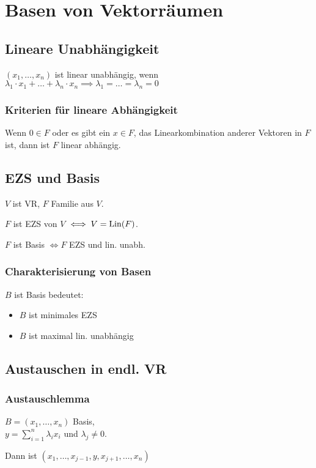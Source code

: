 \section*{Basen von Vektorräumen}

\subsection*{Lineare Unabhängigkeit}
$(x_1, \dots, x_n)$ ist linear unabhängig, wenn \\
$\lambda_1\cdot x_1 + \dots + \lambda_n \cdot x_n \implies \lambda_1 = \dots = \lambda_n = 0$

\subsubsection*{Kriterien für lineare Abhängigkeit}
Wenn $0\in F$ oder es gibt ein $x\in F$, das Linearkombination anderer Vektoren in $F$ ist, dann ist $F$ linear abhängig.

\subsection*{EZS und Basis}
$V$ ist VR, $F$ Familie aus $V$.

$F$ ist EZS von $V$ $\iff V=\operatorname{Lin}(F)$.

$F$ ist Basis $\iff F$ EZS und lin. unabh. 

\subsubsection*{Charakterisierung von Basen}
$B$ ist Basis bedeutet:
\begin{itemize}
	\item $B$ ist minimales EZS
	\item $B$ ist maximal lin. unabhängig
\end{itemize}

\subsection*{Austauschen in endl. VR}
\subsubsection*{Austauschlemma}
$B=(x_1,\dots,x_n)$ Basis, \\
$\displaystyle y=\sum_{i=1}^n \lambda_i x_i$ und $\lambda_j \neq 0$.

Dann ist $(x_1,\dots,x_{j-1},y,x_{j+1},\dots,x_n)$
